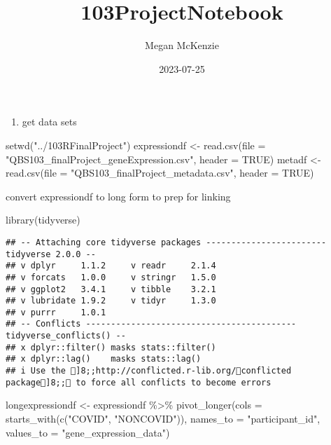 \documentclass[
]{article}
\title{103ProjectNotebook}
\author{Megan McKenzie}
\date{2023-07-25}
\newenvironment{Shaded}{\begin{snugshade}}{\end{snugshade}}
\newcommand{\AttributeTok}[1]{\textcolor[rgb]{0.77,0.63,0.00}{#1}}
\newcommand{\ConstantTok}[1]{\textcolor[rgb]{0.00,0.00,0.00}{#1}}
\newcommand{\FunctionTok}[1]{\textcolor[rgb]{0.00,0.00,0.00}{#1}}
\newcommand{\NormalTok}[1]{#1}
\newcommand{\OtherTok}[1]{\textcolor[rgb]{0.56,0.35,0.01}{#1}}
\newcommand{\SpecialCharTok}[1]{\textcolor[rgb]{0.00,0.00,0.00}{#1}}
\newcommand{\StringTok}[1]{\textcolor[rgb]{0.31,0.60,0.02}{#1}}
\providecommand{\tightlist}{%
  \setlength{\itemsep}{0pt}\setlength{\parskip}{0pt}}
\begin{document}
\maketitle

\begin{enumerate}
\def\labelenumi{\arabic{enumi}.}
\tightlist
\item
  get data sets
\end{enumerate}

\begin{Shaded}
\begin{Highlighting}[]
\FunctionTok{setwd}\NormalTok{(}\StringTok{"../103RFinalProject"}\NormalTok{)}
\NormalTok{expressiondf }\OtherTok{\textless{}{-}} \FunctionTok{read.csv}\NormalTok{(}\AttributeTok{file =} \StringTok{"QBS103\_finalProject\_geneExpression.csv"}\NormalTok{, }\AttributeTok{header =} \ConstantTok{TRUE}\NormalTok{)}
\NormalTok{metadf }\OtherTok{\textless{}{-}} \FunctionTok{read.csv}\NormalTok{(}\AttributeTok{file =} \StringTok{"QBS103\_finalProject\_metadata.csv"}\NormalTok{, }\AttributeTok{header =} \ConstantTok{TRUE}\NormalTok{)}
\end{Highlighting}
\end{Shaded}

convert expressiondf to long form to prep for linking

\begin{Shaded}
\begin{Highlighting}[]
\FunctionTok{library}\NormalTok{(tidyverse)}
\end{Highlighting}
\end{Shaded}

\begin{verbatim}
## -- Attaching core tidyverse packages ------------------------ tidyverse 2.0.0 --
## v dplyr     1.1.2     v readr     2.1.4
## v forcats   1.0.0     v stringr   1.5.0
## v ggplot2   3.4.1     v tibble    3.2.1
## v lubridate 1.9.2     v tidyr     1.3.0
## v purrr     1.0.1     
## -- Conflicts ------------------------------------------ tidyverse_conflicts() --
## x dplyr::filter() masks stats::filter()
## x dplyr::lag()    masks stats::lag()
## i Use the ]8;;http://conflicted.r-lib.org/conflicted package]8;; to force all conflicts to become errors
\end{verbatim}

\begin{Shaded}
\begin{Highlighting}[]
\NormalTok{longexpressiondf }\OtherTok{\textless{}{-}}\NormalTok{ expressiondf }\SpecialCharTok{\%\textgreater{}\%}
  \FunctionTok{pivot\_longer}\NormalTok{(}\AttributeTok{cols =} \FunctionTok{starts\_with}\NormalTok{(}\FunctionTok{c}\NormalTok{(}\StringTok{"COVID"}\NormalTok{, }\StringTok{"NONCOVID"}\NormalTok{)),}
               \AttributeTok{names\_to =} \StringTok{"participant\_id"}\NormalTok{,}
               \AttributeTok{values\_to =} \StringTok{"gene\_expression\_data"}\NormalTok{)}
\end{Highlighting}
\end{Shaded}
\end{document}
